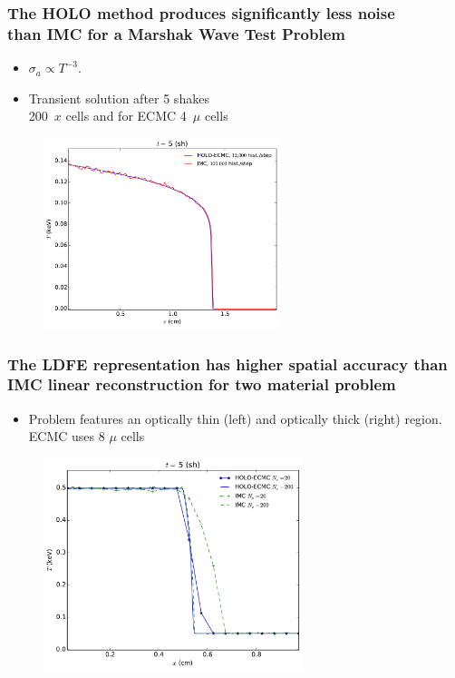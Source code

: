 \documentclass[xcolor=dvipsnames,hyperref={pdfpagelabels=false},unknownkeysallowed]{beamer}
\newcommand{\colb}[1]{{\color{blue} #1}}
\newcommand{\colG}[1]{{\color{Gray!110} #1}}
\newlength{\wideitemsep}
\let\olditem\item
\renewcommand{\item}{\setlength{\itemsep}{\wideitemsep}\olditem}
\begin{document}
\begin{frame}
    \frametitle{The HOLO method produces significantly less noise \\ than IMC for a Marshak Wave Test Problem}
    \centering
        \begin{itemize}
            \item \colb{$\sigma_a\propto T^{-3}$}. 
            \item Transient solution after 5 shakes \\ \colG{200~$x$ cells and for ECMC 4~$\mu$  cells }
        \end{itemize}
    \begin{figure}
    \includegraphics[width=0.615799\textwidth]{marshak_200_compare.pdf}
    \end{figure}
\end{frame}

\begin{frame}
    \frametitle{The LDFE representation has higher spatial accuracy than IMC linear reconstruction for
    two material problem}
        \begin{itemize}
            \item[] Problem features an optically thin (left) and
                optically thick (right) region. \colG{ECMC uses 8 $\mu$ cells}
        \end{itemize}
\begin{figure}
    \centering
    \includegraphics[width=0.6755799\textwidth]{two_mat_conv.pdf}
\end{figure}

\end{frame}
\end{document}
